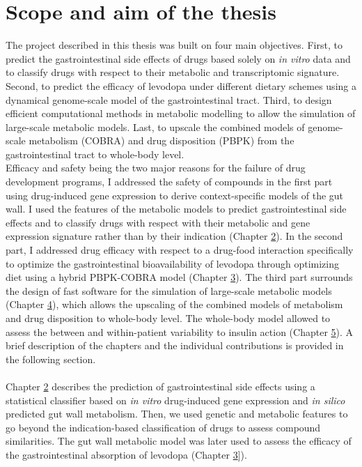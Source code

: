 \section{Scope and aim of the thesis}
The project described in this thesis was built on four main objectives. First, to predict the gastrointestinal side effects of drugs based solely on \textit{in vitro} data and to classify drugs with respect to their metabolic and transcriptomic signature. Second, to predict the efficacy of levodopa under different dietary schemes using a dynamical genome-scale model of the gastrointestinal tract. Third, to design efficient computational methods in metabolic modelling to allow the simulation of large-scale metabolic models. Last, to upscale the combined models of genome-scale metabolism (COBRA) and drug disposition (PBPK) from the gastrointestinal tract to whole-body level. \\
Efficacy and safety being the two major reasons for the failure of drug development programs, I addressed the safety of compounds in the first part using drug-induced gene expression to derive context-specific models of the gut wall. I used the features of the metabolic models to predict gastrointestinal side effects and to classify drugs with respect with their metabolic and gene expression signature rather than by their indication (Chapter \hyperref[ch:chapter2]{2}). In the second part, I addressed drug efficacy with respect to a drug-food interaction specifically to optimize the gastrointestinal bioavailability of levodopa through optimizing diet using a hybrid PBPK-COBRA model (Chapter \hyperref[ch:chapter3]{3}). The third part surrounds the design of fast software for the simulation of large-scale metabolic models (Chapter \hyperref[ch:chapter4]{4}), which allows the upscaling of the combined models of metabolism and drug disposition to whole-body level. The whole-body model allowed to assess the between and within-patient variability to insulin action (Chapter \hyperref[ch:chapter5]{5}).  A brief description of the chapters and the individual contributions is provided in the following section.\\

\\
\noindent Chapter \hyperref[ch:chapter2]{2} describes the prediction of gastrointestinal side effects using a statistical classifier based on \textit{in vitro} drug-induced gene expression and \textit{in silico} predicted gut wall metabolism. Then, we used genetic and metabolic features to go beyond the indication-based classification of drugs to assess compound similarities. The gut wall metabolic model was later used to assess the efficacy of the gastrointestinal absorption of levodopa (Chapter \hyperref[ch:chapter3]{3}]).
